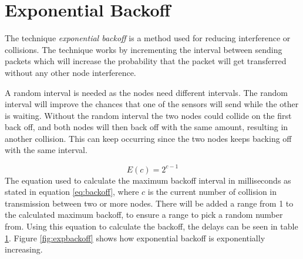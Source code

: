 \section{Exponential Backoff}\label{cha:expbackoff}
The technique \textit{exponential backoff} is a method used for reducing interference or collisions. The technique works by incrementing the interval between sending packets which will increase the probability that the packet will get transferred without any other node interference. 

A random interval is needed as the nodes need different intervals. The random interval will improve the chances that one of the sensors will send while the other is waiting. 
Without the random interval the two nodes could collide on the first back off, and both nodes will then back off with the same amount, resulting in another collision. This can keep occurring since the two nodes keeps backing off with the same interval.

\begin{equation}
\label{eq:backoff}
E(c)=2^{c-1}
\end{equation}
The equation used to calculate the maximum backoff interval in milliseconds as stated in equation \ref{eq:backoff}, where $c$ is the current number of collision in transmission between two or more nodes.
There will be added a range from 1 to the calculated maximum backoff, to ensure a range to pick a random number from. Using this equation to calculate the backoff, the delays can be seen in table \ref{cha:expbackoff}.
Figure \ref{fig:expbackoff} shows how exponential backoff is exponentially increasing.

